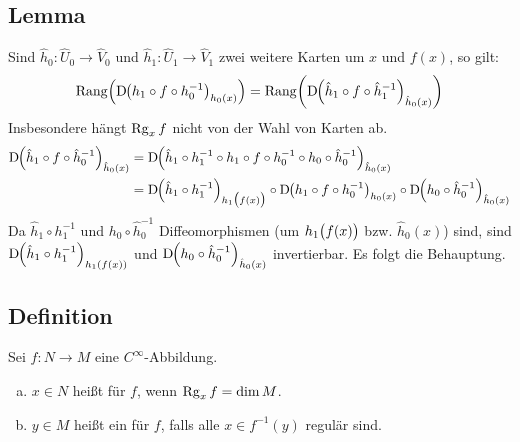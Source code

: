 \subsection[Lemma: Die Definition des Ranges hängt nicht von Karten ab]{Lemma} %
\label{sub:164}
Sind $\hat{h}_0 : \hat{U}_0 \to \hat{V}_0$ und $\hat{h}_1 : \hat{U}_1 \to \hat{V}_1$ zwei weitere Karten um $x$ und $f(x)$, so gilt:
\[
	\mathrm{Rang} \enbrace*{\D \enbrace*{h_1 \circ f \circ h_0 ^{-1}}_{h_0(x)} } = \mathrm{Rang} \enbrace*{\D \enbrace*{\hat{h}_1 \circ f \circ \hat{h}_1 ^{-1}}_{\hat{h}_0(x)} }  
\]
Insbesondere hängt $\Rg_x f$ nicht von der Wahl von Karten ab.
\begin{align*}
	\D \enbrace*{\hat{h}_1 \circ f \circ \hat{h}_0 ^{-1}}_{\hat{h}_0(x)}&= \D \enbrace*{\hat{h}_1 \circ h_1 ^{-1} \circ h_1 \circ f \circ h_0 ^{-1} \circ h_0 \circ \hat{h}_0 ^{-1}}_{\hat{h}_0(x)}\\
	&= \D \enbrace*{\hat{h}_1 \circ  h_1 ^{-1}}_{h_1\enbrace[\big]{f(x)}} \circ  \D \enbrace*{h_1 \circ f \circ h_0 ^{-1}}_{h_0(x)} \circ \D \enbrace*{h_0 \circ \hat{h}_0 ^{-1}}_{\hat{h}_0(x)}   
\end{align*}
Da $\hat{h}_1 \circ h_1 ^{-1}$ und $h_0 \circ \hat{h}_0 ^{-1}$ Diffeomorphismen (um $h_1\enbrace[\big]{f(x)}$ bzw. $\hat{h}_0 (x)$) sind, sind 
$\D \enbrace*{\hat{h}_1 \circ  h_1 ^{-1}}_{h_1\enbrace*{f(x)}}$ und $\D \enbrace*{h_0 \circ \hat{h}_0 ^{-1}}_{\hat{h}_0(x)}$ invertierbar. Es folgt die Behauptung. \bewende

\subsection[Definition: reguläre Werte]{Definition} %
\label{sub:166}
Sei $f : N \to M$ eine $C^\infty$-Abbildung.
\begin{enumerate}[a)]
	\item $x \in N$ heißt  für $f$, wenn $\Rg_x f = \dim M$.
	\item $y \in M$ heißt ein  für $f$, falls alle $x \in f ^{-1} (y)$ regulär sind.
\end{enumerate}

